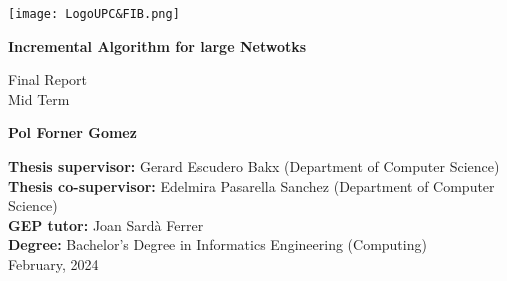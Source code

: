 \begin{titlepage}
    \centering

    \vspace*{1cm}
    \texttt{[image: LogoUPC\&FIB.png]}

    \vspace*{2cm}
    {\huge \textbf{Incremental Algorithm for large Netwotks}}

    \vspace*{.5cm}
    {\LARGE Final Report} \\
    {\LARGE Mid Term}


    \vspace{2cm}

    \LARGE

    \begin{minipage}{.5\textwidth}
        \centering
        \textbf{Pol Forner Gomez}
    \end{minipage}

    \large

    \vfill

    \textbf{Thesis supervisor:}  Gerard Escudero Bakx (Department of Computer Science) \\
    \textbf{Thesis co-supervisor:}  Edelmira Pasarella Sanchez (Department of Computer Science) \\
    \textbf{GEP tutor:}  Joan Sardà Ferrer \\
    \textbf{Degree:}  Bachelor's Degree in Informatics Engineering (Computing) \\

    February, 2024
\end{titlepage}